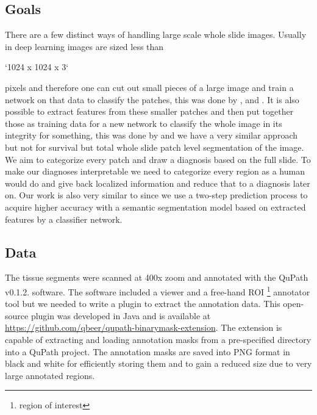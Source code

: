 \documentclass[a4paper,12pt]{article}
\begin{document}
\vspace{4mm}

\subsection{Goals}

\vspace{4mm}

\par There are a few distinct ways of handling large scale whole slide images. Usually in deep learning images are sized less than \begin{markdown}
`1024 x 1024 x 3`
\end{markdown} 
pixels and therefore one can cut out small pieces of a large image and train a network on that data to classify the patches, this was done by \cite{korbar2017deep}, \cite{bychkov2018deep} and \cite{skrede2020deep}. It is also possible to extract features from these smaller patches and then put together those as training data for a new network to classify the whole image in its integrity for something, this was done by \cite{skrede2020deep} and we have a very similar approach but not for survival but total whole slide patch level segmentation of the image. We aim to categorize every patch and draw a diagnosis based on the full slide. To make our diagnoses interpretable we need to categorize every region as a human would do and give back localized information and reduce that to a diagnosis later on. Our work is also very similar to \cite{takahama2019multi} since we use a two-step prediction process to acquire higher accuracy with a semantic segmentation model based on extracted features by a classifier network.

\vspace{4mm}

\subsection{Data}

\vspace{4mm}

\par The tissue segments were scanned at 400x zoom and annotated with the QuPath v0.1.2. software. The software included a viewer and a free-hand ROI \footnote{region of interest} annotator tool but we needed to write a plugin to extract the annotation data. This open-source plugin was developed in Java and is available at \url{https://github.com/qbeer/qupath-binarymask-extension}. The extension is capable of extracting and loading annotation masks from a pre-specified directory into a QuPath project. The annotation masks are saved into PNG format in black and white for efficiently storing them and to gain a reduced size due to very large annotated regions.
\end{document}
